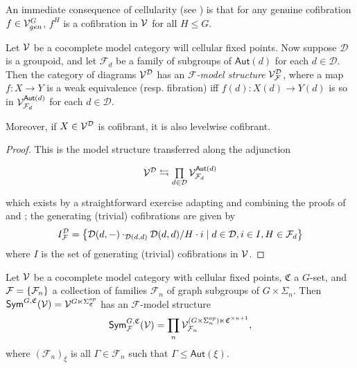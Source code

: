 \documentclass[a4paper,10pt
,draft
]{article}%
\renewcommand{\F}{\mathcal F}
\renewcommand{\1}{\eta}%
\begin{document}
\begin{remark}
      \label{LEVEL_COF_REM}
      An immediate consequence of cellularity (see \cite[Prop. 6.3(i)]{BP_geo})
      is that for any genuine cofibration $f \in \mathcal V^G_{gen}$,
      $f^H$ is a cofibration in $\mathcal V$ for all $H \leq G$.
\end{remark}


\begin{proposition}
      \label{TRANS_MODEL_PROP}
      Let $\mathcal V$ be a cocomplete model category will cellular fixed points.
      Now suppose $\mathcal D$ is a groupoid, and let $\F_d$ be a family of subgroups of $\mathsf{Aut}(d)$ for each $d \in \mathcal D$.
      Then the category of diagrams $\mathcal V^{\mathcal D}$ has an \textit{$\F$-model structure} $\V^\D_\F$, where
      a map $f: X \to Y$ is a
      weak equivalence (resp. fibration) iff $f(d): X(d) \to Y(d)$ is so in $\V^{\mathsf{Aut}(d)}_{\F_d}$ for each $d \in \mathcal D$.

      Moreover, if $X \in \mathcal V^{\mathcal D}$ is cofibrant, it is also levelwise cofibrant.
\end{proposition}
\begin{proof}
      This is the model structure transferred along the adjunction
      \begin{equation}
            \begin{tikzcd}
                  \V^\D \leftrightarrows
                  \mathop{\prod}\limits_{d \in \D}\V^{\mathsf{Aut}(d)}_{\F_d}
            \end{tikzcd}
      \end{equation}
      which exists by a straightforward exercise adapting and combining the proofs of
      \cite[Thm 11.6.1]{Hir03} and \cite[Prop 2.6]{Ste16};
      the generating (trivial) cofibrations are given by
      \begin{equation}
            I^{\mathcal D}_\F = \sets{\mathcal D(d,-) \cdot_{\mathcal D(d,d)} \mathcal D(d,d)/H \cdot i}{d \in \mathcal D, i \in I, H \in \F_d}
      \end{equation}
      where $I$ is the set of generating (trivial) cofibrations in $\mathcal V$.
\end{proof}

\begin{example}
      Let $\mathcal V$ be a cocomplete model category with cellular fixed points,
      $\mathfrak C$ a $G$-set, and $\F = \set{\F_n}$ a collection of families $\F_n$ of graph subgroups of $G \times \Sigma_n$.
      Then $\mathsf{Sym}^{G,\mathfrak C}(\mathcal V) = \mathcal V^{G \ltimes \Sigma_{\mathfrak C}^{op}}$ has an $\F$-model structure
      \begin{equation}
            \Sym^{G,\mathfrak C}_\F(\V) = \prod_n \V^{(G \times \Sigma_n^{op}) \ltimes \mathfrak C^{\times n+1}}_{\F_n},
      \end{equation}
      where
      $(\F_n)_{\xi}$ is all $\Gamma \in \F_n$ such that $\Gamma \leq \mathsf{Aut}(\xi)$.
\end{example}
\end{document}
